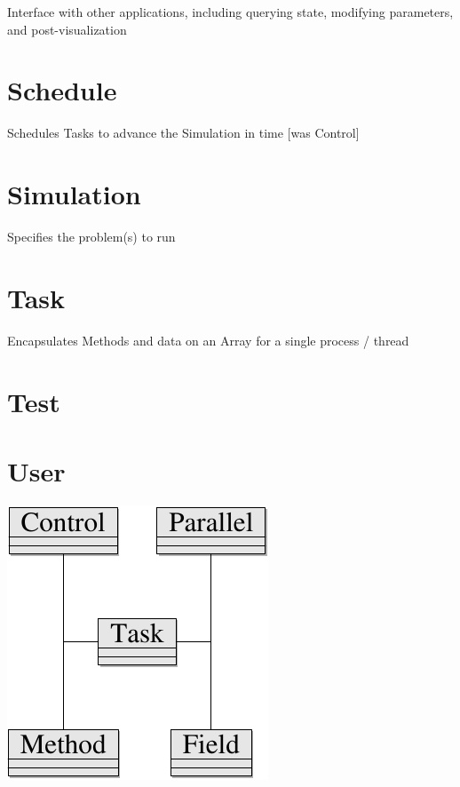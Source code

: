 \documentclass{book}
\begin{document}
Interface with other applications, including querying state, modifying
parameters, and post-visualization

\section{Schedule}
Schedules Tasks to advance the Simulation in time [was Control]

\section{Simulation}

Specifies the problem(s) to run

\section{Task}

Encapsulates Methods and data on an Array for a single process /
thread

\section{Test}

\section{User}

\centerline{\includegraphics{uml/task.pdf}}
\end{document}
